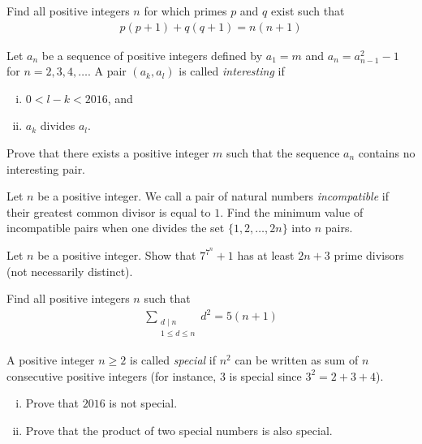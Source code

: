 \begin{problem}
	Find all positive integers $n$ for which primes $p$ and $q$ exist such that
	\begin{align*}
		p(p+1) + q(q+1) = n(n+1)
	\end{align*}
\end{problem}

\begin{problem}
	Let $a_n$ be a sequence of positive integers defined by $a_1 = m$ and $a_{n} = a_{n-1}^2 - 1$ for $n= 2, 3, 4, \dots$. A pair $(a_k, a_l)$ is called \textit{interesting} if
	\begin{enumerate}[(i)]
		\item $0 < l - k < 2016$, and
		\item $a_k$ divides $a_l$.
	\end{enumerate}
	Prove that there exists a positive integer $m$ such that the sequence $a_n$ contains no interesting pair.
\end{problem}

\begin{problem}
	Let $n$ be a positive integer. We call a pair of natural numbers \textit{incompatible} if their greatest common divisor is equal to $1$. Find the minimum value of incompatible pairs when one divides the set $\{1,2,\dots,2n\}$ into $n$ pairs.
\end{problem}

\begin{problem}
	Let $n$ be a positive integer. Show that $7^{7^n} + 1$ has at least $2n + 3$ prime divisors (not necessarily distinct).
\end{problem}

\begin{problem}
	Find all positive integers $n$ such that
	\begin{align*}
		\sum_{\substack{d \mid n \\ 1 \leq d \leq n}} d^2 = 5(n+1)
	\end{align*}
\end{problem}

\begin{problem}
	A positive integer $n \geq 2$ is called \textit{special} if $n^2$ can be written as sum of $n$ consecutive positive integers (for instance, $3$ is special since $3^2 = 2 + 3 + 4$).
	\begin{enumerate}[(i)]
		\item Prove that $2016$ is not special.
		\item Prove that the product of two special numbers is also special.
	\end{enumerate}
\end{problem}

